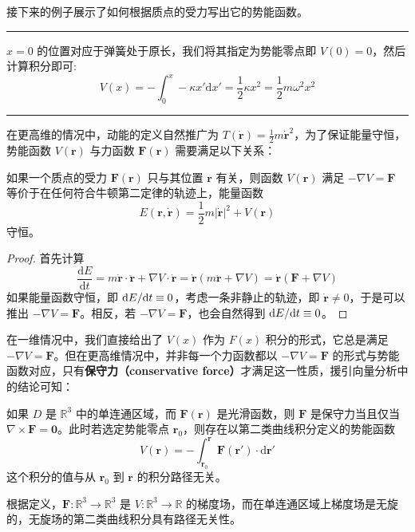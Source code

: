 \documentclass[cn,10pt,math=newtx,citestyle=gb7714-2015,bibstyle=gb7714-2015]{elegantbook}
\def\bm{\boldsymbol}
\def\d{\mathrm d}
\def\R{\mathbb R}
\def\ra{\rightarrow}
\def\srule{\noindent\rule{\linewidth}{0.3mm}}
\begin{document}
接下来的例子展示了如何根据质点的受力写出它的势能函数。

\srule

\begin{instance}[一维谐振子势]
$x=0$ 的位置对应于弹簧处于原长，我们将其指定为势能零点即 $V(0)=0$，然后计算积分即可:
    \begin{equation*}
        V(x) = -\int_0^x -\kappa x'\d x'=\frac{1}{2}\kappa x^2=\frac{1}{2}m\omega^2x^2
    \end{equation*}
\end{instance}

\srule

在更高维的情况中，动能的定义自然推广为 $T(\dot{\bm r})=\frac{1}{2}m \dot{\bm r}^2$，为了保证能量守恒，势能函数 $V(\bm r)$ 与力函数 $\bm F(\bm r)$ 需要满足以下关系：

\begin{theorem}[能量守恒定律-v1.0]
    如果一个质点的受力 $\bm F(\bm r)$ 只与其位置 $\bm r$ 有关，则函数 $V(\bm r)$ 满足 $-\nabla V=\bm F$ 等价于在任何符合牛顿第二定律的轨迹上，能量函数
    \begin{equation*}
        E(\bm r,\dot{\bm r})=\frac{1}{2}m|\dot{\bm r}|^2+V(\bm r)
    \end{equation*}
    守恒。
\end{theorem}
\begin{proof}
    首先计算
    \begin{equation}
        \frac{\d E}{\d t}=m\dot{\bm r}\cdot\ddot{\bm r}+\nabla V\cdot\dot{\bm r}=\dot{\bm r}(m\ddot{\bm r}+\nabla V)=\dot{\bm r}(\bm F+\nabla V)
    \end{equation}
    如果能量函数守恒，即 $\text dE/\text dt\equiv 0$，考虑一条非静止的轨迹，即 $\dot{\bm r}\ne 0$，于是可以推出 $-\nabla V=\bm F$。相反，若 $-\nabla V=\bm F$，也会自然得到 $\text dE/\text dt\equiv 0$。
\end{proof}

在一维情况中，我们直接给出了 $V(x)$ 作为 $F(x)$ 积分的形式，它总是满足 $-\nabla V=\bm F$。但在更高维情况中，并非每一个力函数都以 $-\nabla V=\bm F$ 的形式与势能函数对应，只有\textbf{保守力（conservative force）}才满足这一性质，援引向量分析中的结论可知：

\begin{theorem}[保守力的等价条件]\label{thm:cndtn_cnsrvtv_frc}
    如果 $D$ 是 $\R^3$ 中的单连通区域，而 $\bm F(\bm r)$ 是光滑函数，则 $\bm F$ 是保守力当且仅当 $\nabla\times\bm F=\bm 0$。此时若选定势能零点 $\bm r_0$，则存在以第二类曲线积分定义的势能函数
    \begin{equation*}
        V(\bm r) = -\int_{\bm r_0}^{\bm r} \bm F(\bm r')\cdot\bm{\d r'}
    \end{equation*}
    这个积分的值与从 $\bm r_0$ 到 $\bm r$ 的积分路径无关。
\end{theorem}
\begin{remark}
    根据定义，$\bm F:\R^3\ra \R^3$ 是 $V:\R^3\ra\R$ 的梯度场，而在单连通区域上梯度场是无旋的，无旋场的第二类曲线积分具有路径无关性。
\end{remark}
\end{document}
